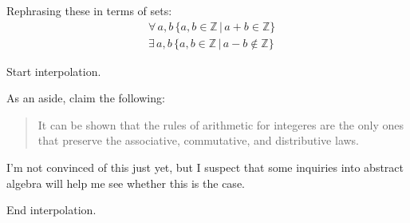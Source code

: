 \documentclass[leqno]{article}
\begin{document}
Rephrasing these in terms of sets:
\begin{align}
    &\forall \, a, b \, \{a, b \in \mathbb{Z} \,|\, a+b \in \mathbb{Z}\}\\
    &\exists \, a, b \, \{a, b \in \mathbb{Z} \,|\, a-b \not\in \mathbb{Z}\}
\end{align}

Start interpolation.

As an aside, \textcite{fisherIntegratedAlgebraTrigonometry1962} claim the following:
\begin{quote}
    It can be shown that the rules of arithmetic
    for integeres are the only ones that preserve
    the associative, commutative, and distributive
    laws.
\end{quote}

I'm not convinced of this just yet, but I suspect that some inquiries into abstract algebra will help me see whether this is the case.

End interpolation.


\newpage
\printbibliography
\end{document}
